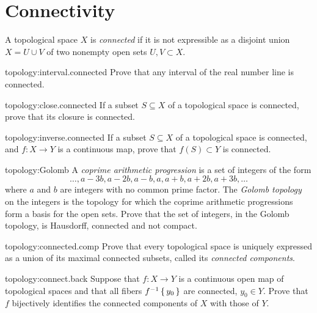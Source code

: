 \section{Connectivity}
A topological space \(X\) is \emph{connected} if it is not expressible as a disjoint union \(X= U \cup V\) of two nonempty open sets \(U,V \subset X\).
\begin{problem*}{topology:interval.connected}
Prove that any interval of the real number line is connected.
\end{problem*}
\begin{problem*}{topology:close.connected}
If a subset \(S\subseteq X\) of a topological space is connected, prove that its closure is connected.
\end{problem*}
\begin{problem*}{topology:inverse.connected}
If a subset \(S\subseteq X\) of a topological space is connected, and \(f\colon X \to Y\) is a continuous map, prove that \(f(S)\subset Y\) is connected.
\end{problem*}
\begin{problem*}{topology:Golomb}
A \emph{coprime arithmetic progression} is a set of integers of the form
\[
\dots,a-3b,a-2b,a-b,a,a+b,a+2b,a+3b,\dots
\]
where \(a\) and \(b\) are integers with no common prime factor.
The \emph{Golomb topology} on the integers is the topology for which the coprime arithmetic progressions form a basis for the open sets.
Prove that the set of integers, in the Golomb topology, is Hausdorff, connected and not compact.
\end{problem*}
\begin{problem}{topology:connected.comp}
Prove that every topological space is uniquely expressed as a union of its maximal connected subsets, called its \emph{connected components}.
\end{problem}
\begin{problem}{topology:connect.back}
Suppose that \(f\colon X \to Y\) is a continuous open map of topological spaces and that all fibers \(f^{-1}\set{y_0}\) are connected, \(y_0\in Y\). 
Prove that \(f\) bijectively identifies the connected components of \(X\) with those of \(Y\).
\end{problem}

